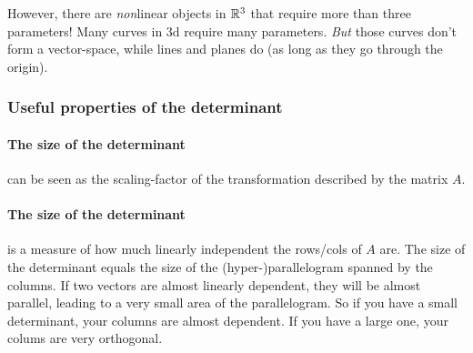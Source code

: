 However, there are \emph{non}linear objects in $\mathbb{R}^3$ that require more than three parameters! Many curves in 3d require many parameters. \emph{But} those curves don't form a vector-space, while lines and planes do (as long as they go through the origin). 


\subsubsection{Useful properties of the determinant}

\paragraph{The size of the determinant} can be seen as the scaling-factor of the transformation described by the matrix $A$.

\paragraph{The size of the determinant} is a measure of how much linearly independent the rows/cols of $A$ are. The size of the determinant equals the size of the (hyper-)parallelogram spanned by the columns. If two vectors are almost linearly dependent, they will be almost parallel, leading to a very small area of the parallelogram. So if you have a small determinant, your columns are almost dependent. If you have a large one, your colums are very orthogonal. 

